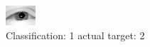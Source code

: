 \begin{figure}[h!]
\begin{center}
\includegraphics[width=0.60\columnwidth]{figures/ID2230_class_1_target_2.png}
\end{center}
\caption{ Classification: 1 actual target: 2}
\label{fig:ID2230_class_1_target_2}
\end{figure}
